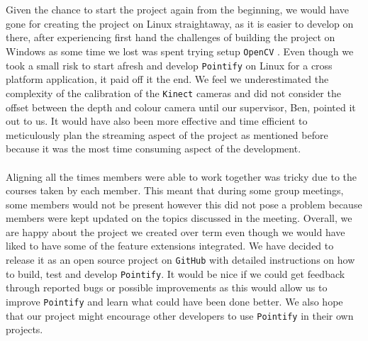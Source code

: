 \documentclass{article}
\begin{document}
\\\\
Given the chance to start the project again from the beginning, we would have gone for creating the project on Linux straightaway, as it is easier to develop on there, after experiencing first hand the challenges of building the project on Windows as some time we lost was spent trying setup \texttt{OpenCV} \cite{opencv}. Even though we took a small risk to start afresh and develop \texttt{Pointify} on Linux for a cross platform application, it paid off it the end. We feel we underestimated the complexity of the calibration of the \texttt{Kinect} cameras and did not consider the offset between the depth and colour camera until our supervisor, Ben, pointed it out to us. It would have also been more effective and time efficient to meticulously plan the streaming aspect of the project as mentioned before because it was the most time consuming aspect of the development.
\\\\
Aligning all the times members were able to work together was tricky due to the courses taken by each member. This meant that during some group meetings, some members would not be present however this did not pose a problem because members were kept updated on the topics discussed in the meeting. Overall, we are happy about the project we created over term even though we would have liked to have some of the feature extensions integrated. We have decided to release it as an open source project on \texttt{GitHub} with detailed instructions on how to build, test and develop \texttt{Pointify}. It would be nice if we could get feedback through reported bugs or possible improvements as this would allow us to improve \texttt{Pointify} and learn what could have been done better. We also hope that our project might encourage other developers to use \texttt{Pointify} in their own projects. 
\fi %
\end{document}
